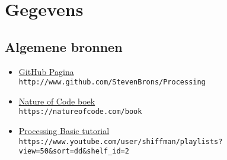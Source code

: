 \documentclass{article}
\newcommand{\myhref}[2]{\href{#1}{#2}\\\texttt{#1}}
\begin{document}
\title{\tttt}
\author{Steven Bronsveld}

\maketitle
\section{Gegevens}

\subsection{Algemene bronnen}
\begin{itemize}
    \item \myhref{http://www.github.com/StevenBrons/Processing}{GitHub Pagina} 
    \item \myhref{https://natureofcode.com/book}{Nature of Code boek} 
    \item \myhref{https://www.youtube.com/user/shiffman/playlists?view=50\&sort=dd\&shelf\_id=2}{Processing Basic tutorial}
\end{itemize}


\newpage
\end{document}
